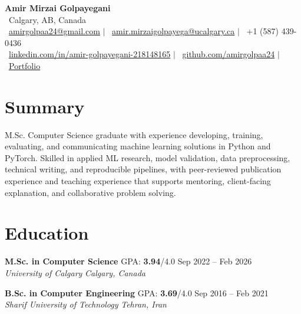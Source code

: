 \documentclass[a4paper,10pt]{article}
\newcommand{\resumeEducationSubheading}[5]{
    \textbf{#1} \hfill #2 \hfill #3 \\
    \textit{#4} \hfill \textit{#5}
}
\begin{document}

\begin{center}
    {\LARGE \textbf{Amir Mirzai Golpayegani}} \\[0.25em]
    \faMapMarker*~Calgary, AB, Canada \\[0.25em]
    \faEnvelope~\href{mailto:amirgolpaa24@gmail.com}{amirgolpaa24@gmail.com}
    $|$
    \faEnvelope~\href{mailto:amir.mirzaigolpayega@ucalgary.ca}{amir.mirzaigolpayega@ucalgary.ca}
    $|$
    \faPhone*~+1 (587) 439-0436 \\[0.25em]
    \faLinkedin~\href{https://linkedin.com/in/amir-golpayegani-218148165}{linkedin.com/in/amir-golpayegani-218148165}
    $|$
    \faGithub~\href{https://github.com/amirgolpaa24}{github.com/amirgolpaa24}
    $|$
    \faGlobe~\href{https://amir-portfolio-navy.vercel.app/}{Portfolio}
\end{center}


\section*{Summary}

M.Sc. Computer Science graduate with experience developing, training, evaluating, and communicating machine learning solutions in Python and PyTorch. Skilled in applied ML research, model validation, data preprocessing, technical writing, and reproducible pipelines, with peer-reviewed publication experience and teaching experience that supports mentoring, client-facing explanation, and collaborative problem solving.


\section*{Education}

\resumeEducationSubheading
{M.Sc. in Computer Science}
{GPA: \textbf{3.94}/4.0}
{Sep 2022 -- Feb 2026}
{University of Calgary}
{Calgary, Canada}

\vspace{0.35em}

\resumeEducationSubheading
{B.Sc. in Computer Engineering}
{GPA: \textbf{3.69}/4.0}
{Sep 2016 -- Feb 2021}
{Sharif University of Technology}
{Tehran, Iran}

\end{document}
